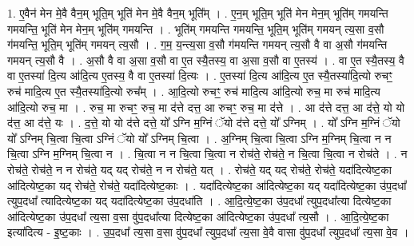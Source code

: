 \documentclass[17pt]{extarticle}
\begin{document}
1. ए॒वैन॑ मेन मे॒वै वैन॒म् भूति॒म् भूति॑ मेन मे॒वै वैन॒म् भूति᳚म् । . ए॒न॒म् भूति॒म् भूति॑ मेन मेन॒म् भूति॑म् गमयन्ति गमयन्ति॒ भूति॑ मेन मेन॒म् भूति॑म् गमयन्ति । . भूति॑म् गमयन्ति गमयन्ति॒ भूति॒म् भूति॑म् गमयन् त्य॒सा व॒सौ ग॑मयन्ति॒ भूति॒म् भूति॑म् गमयन् त्य॒सौ । . ग॒म॒ य॒न्त्य॒सा व॒सौ ग॑मयन्ति गमयन् त्य॒सौ वै वा अ॒सौ ग॑मयन्ति गमयन् त्य॒सौ वै । . अ॒सौ वै वा अ॒सा व॒सौ वा ए॒त स्यै॒तस्य॒ वा अ॒सा व॒सौ वा ए॒तस्य॑ । . वा ए॒त स्यै॒तस्य॒ वै वा ए॒तस्या॑ दि॒त्य आ॑दि॒त्य ए॒तस्य॒ वै वा ए॒तस्या॑ दि॒त्यः । . ए॒तस्या॑ दि॒त्य आ॑दि॒त्य ए॒त स्यै॒तस्या॑दि॒त्यो रुचꣳ॒॒ रुच॑ मादि॒त्य ए॒त स्यै॒तस्या॑दि॒त्यो रुच᳚म् । . आ॒दि॒त्यो रुचꣳ॒॒ रुच॑ मादि॒त्य आ॑दि॒त्यो रुच॒ मा रुच॑ मादि॒त्य आ॑दि॒त्यो रुच॒ मा । . रुच॒ मा रुचꣳ॒॒ रुच॒ मा द॑त्ते दत्त॒ आ रुचꣳ॒॒ रुच॒ मा द॑त्ते । . आ द॑त्ते दत्त॒ आ द॑त्ते॒ यो यो द॑त्त॒ आ द॑त्ते॒ यः । . द॒त्ते॒ यो यो द॑त्ते दत्ते॒ यो᳚ ऽग्नि म॒ग्निं ॅयो द॑त्ते दत्ते॒ यो᳚ ऽग्निम् । . यो᳚ ऽग्नि म॒ग्निं ॅयो यो᳚ ऽग्निम् चि॒त्वा चि॒त्वा ऽग्निं ॅयो यो᳚ ऽग्निम् चि॒त्वा । . अ॒ग्निम् चि॒त्वा चि॒त्वा ऽग्नि म॒ग्निम् चि॒त्वा न न चि॒त्वा ऽग्नि म॒ग्निम् चि॒त्वा न । . चि॒त्वा न न चि॒त्वा चि॒त्वा न रोच॑ते॒ रोच॑ते॒ न चि॒त्वा चि॒त्वा न रोच॑ते । . न रोच॑ते॒ रोच॑ते॒ न न रोच॑ते॒ यद् यद् रोच॑ते॒ न न रोच॑ते॒ यत् । . रोच॑ते॒ यद् यद् रोच॑ते॒ रोच॑ते॒ यदा॑दित्येष्ट॒का आ॑दित्येष्ट॒का यद् रोच॑ते॒ रोच॑ते॒ यदा॑दित्येष्ट॒काः । . यदा॑दित्येष्ट॒का आ॑दित्येष्ट॒का यद् यदा॑दित्येष्ट॒का उ॑प॒दधा᳚ त्युप॒दधा᳚ त्यादित्येष्ट॒का यद् यदा॑दित्येष्ट॒का उ॑प॒दधा॑ति । . आ॒दि॒त्ये॒ष्ट॒का उ॑प॒दधा᳚ त्युप॒दधा᳚त्या दित्येष्ट॒का आ॑दित्येष्ट॒का उ॑प॒दधा᳚ त्य॒सा व॒सा वु॑प॒दधा᳚त्या दित्येष्ट॒का आ॑दित्येष्ट॒का उ॑प॒दधा᳚ त्य॒सौ । . आ॒दि॒त्ये॒ष्ट॒का इत्या॑दित्य - इ॒ष्ट॒काः । . उ॒प॒दधा᳚ त्य॒सा व॒सा वु॑प॒दधा᳚ त्युप॒दधा᳚ त्य॒सा वे॒वै वासा वु॑प॒दधा᳚ त्युप॒दधा᳚ त्य॒सा वे॒व । \newline
\end{document}
